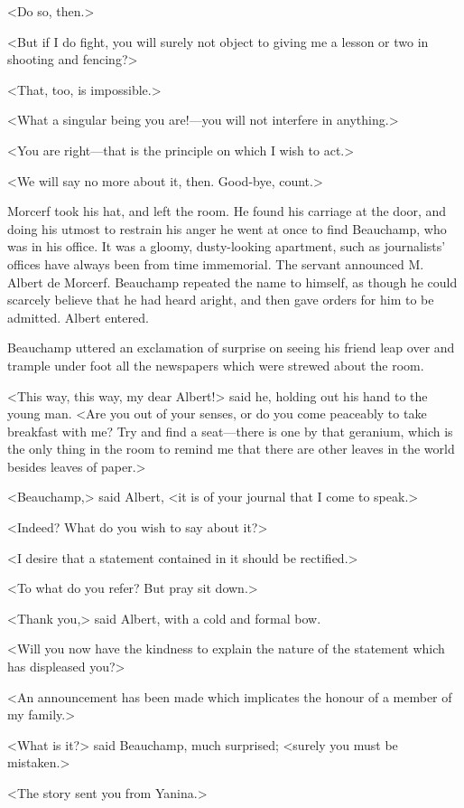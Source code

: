  <Do so, then.> 

 <But if I do fight, you will surely not object to giving me a lesson or two in shooting and fencing?> 

 <That, too, is impossible.> 

 <What a singular being you are!—you will not interfere in anything.> 

 <You are right—that is the principle on which I wish to act.> 

 <We will say no more about it, then. Good-bye, count.> 

 Morcerf took his hat, and left the room. He found his carriage at the door, and doing his utmost to restrain his anger he went at once to find Beauchamp, who was in his office. It was a gloomy, dusty-looking apartment, such as journalists' offices have always been from time immemorial. The servant announced M. Albert de Morcerf. Beauchamp repeated the name to himself, as though he could scarcely believe that he had heard aright, and then gave orders for him to be admitted. Albert entered. 

 Beauchamp uttered an exclamation of surprise on seeing his friend leap over and trample under foot all the newspapers which were strewed about the room. 

 <This way, this way, my dear Albert!> said he, holding out his hand to the young man. <Are you out of your senses, or do you come peaceably to take breakfast with me? Try and find a seat—there is one by that geranium, which is the only thing in the room to remind me that there are other leaves in the world besides leaves of paper.> 

 <Beauchamp,> said Albert, <it is of your journal that I come to speak.> 

 <Indeed? What do you wish to say about it?> 

 <I desire that a statement contained in it should be rectified.> 

 <To what do you refer? But pray sit down.> 

 <Thank you,> said Albert, with a cold and formal bow. 

 <Will you now have the kindness to explain the nature of the statement which has displeased you?> 

 <An announcement has been made which implicates the honour of a member of my family.> 

 <What is it?> said Beauchamp, much surprised; <surely you must be mistaken.> 

 <The story sent you from Yanina.> 

